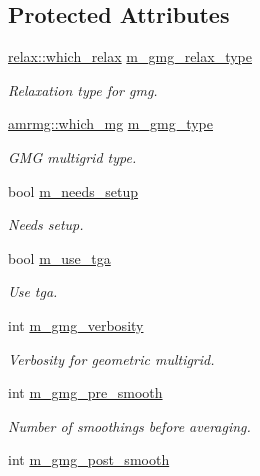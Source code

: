 \subsection*{Protected Attributes}
\begin{DoxyCompactItemize}
\item 
\hyperlink{namespacerelax_a1b017edf55c06d103aa5b61e015fe219}{relax\+::which\+\_\+relax} \hyperlink{classeddington__sp1_af98b7ae31d33b6111551f857cae4b47b}{m\+\_\+gmg\+\_\+relax\+\_\+type}
\begin{DoxyCompactList}\small\item\em Relaxation type for gmg. \end{DoxyCompactList}\item 
\hyperlink{namespaceamrmg_aa3e75c1253c968e52106305f762a7952}{amrmg\+::which\+\_\+mg} \hyperlink{classeddington__sp1_ac1c0be0f42857fe5a515a28f337f5b2f}{m\+\_\+gmg\+\_\+type}
\begin{DoxyCompactList}\small\item\em G\+MG multigrid type. \end{DoxyCompactList}\item 
bool \hyperlink{classeddington__sp1_a854d16ba64e762d17a0b6bd93ae5966f}{m\+\_\+needs\+\_\+setup}
\begin{DoxyCompactList}\small\item\em Needs setup. \end{DoxyCompactList}\item 
bool \hyperlink{classeddington__sp1_ad2882829d0356f7a1d5afb1823b3d744}{m\+\_\+use\+\_\+tga}
\begin{DoxyCompactList}\small\item\em Use tga. \end{DoxyCompactList}\item 
int \hyperlink{classeddington__sp1_a63f5d931c8bc9b7dd0f5d3430b70f261}{m\+\_\+gmg\+\_\+verbosity}
\begin{DoxyCompactList}\small\item\em Verbosity for geometric multigrid. \end{DoxyCompactList}\item 
int \hyperlink{classeddington__sp1_a157abefad919cf453a00384302d141cd}{m\+\_\+gmg\+\_\+pre\+\_\+smooth}
\begin{DoxyCompactList}\small\item\em Number of smoothings before averaging. \end{DoxyCompactList}\item 
int \hyperlink{classeddington__sp1_aee5dbd38bd6d7095e1f794225b011b7f}{m\+\_\+gmg\+\_\+post\+\_\+smooth}

\end{DoxyCompactItemize}
